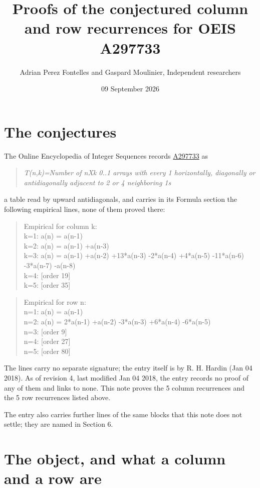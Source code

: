 \documentclass[11pt]{article}
\title{Proofs of the conjectured column and row recurrences for OEIS A297733}
\author{Adrian Perez Fontelles and Gaspard Moulinier, Independent researchers}
\date{09 September 2026}
\theoremstyle{definition}
\begin{document}
\maketitle
\section{The conjectures}

The Online Encyclopedia of Integer Sequences records \href{https://oeis.org/A297733}{A297733} as

\begin{quote}\itshape T(n,k)=Number of nXk 0..1 arrays with every 1 horizontally, diagonally or antidiagonally adjacent to 2 or 4 neighboring 1s\end{quote}

a table read by upward antidiagonals, and carries in its Formula section the following empirical lines, none of them proved there:

\begin{quote}\ttfamily Empirical for column k:\\
k=1: a(n) = a(n-1)\\k=2: a(n) = a(n-1) +a(n-3)\\k=3: a(n) = a(n-1) +a(n-2) +13*a(n-3) -2*a(n-4) +4*a(n-5) -11*a(n-6) -3*a(n-7) -a(n-8)\\k=4: [order 19]\\k=5: [order 35]\end{quote}

\begin{quote}\ttfamily Empirical for row n:\\
n=1: a(n) = a(n-1)\\n=2: a(n) = 2*a(n-1) +a(n-2) -3*a(n-3) +6*a(n-4) -6*a(n-5)\\n=3: [order 9]\\n=4: [order 27]\\n=5: [order 80]\end{quote}

The lines carry no separate signature; the entry itself is by R. H. Hardin (Jan 04 2018). As of revision 4, last modified Jan 04 2018, the entry records no proof of any of them and links to none. This note proves the 5 column recurrences and the 5 row recurrences listed above.

The entry also carries further lines of the same blocks that this note does not settle; they are named in Section 6.

\section{The object, and what a column and a row are}
\end{document}
